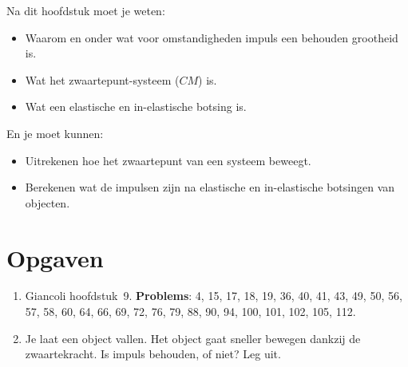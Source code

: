 Na dit hoofdstuk moet je weten:
\begin{itemize}
\item Waarom en onder wat voor omstandigheden impuls een behouden grootheid is.
\item Wat het zwaartepunt-systeem ($CM$) is.
\item Wat een elastische en in-elastische botsing is.
\end{itemize}
En je moet kunnen:
\begin{itemize}
\item Uitrekenen hoe het zwaartepunt van een systeem beweegt.
\item Berekenen wat de impulsen zijn na elastische en in-elastische 
botsingen van objecten.
\end{itemize}

\section{Opgaven}

\begin{enumerate}
\item Giancoli hoofdstuk~9. {\bf Problems}: 4, 15, 17, 18, 19, 36, 40, 41, 43, 49, 50, 56, 57, 58, 60, 
64, 66, 69, 72,  76, 79, 88, 90, 94, 100, 101, 102, 105, 112.
\item Je laat een object vallen. Het object gaat sneller bewegen dankzij de zwaartekracht. Is impuls
behouden, of niet? Leg uit.
\end{enumerate}

